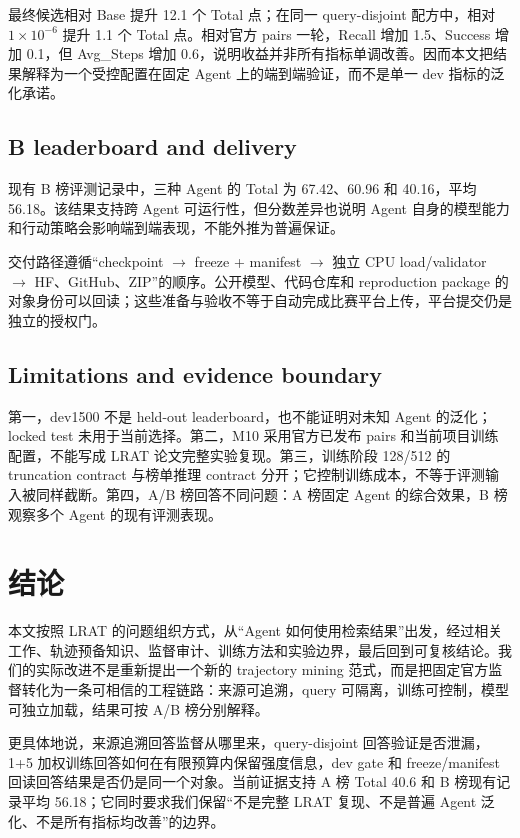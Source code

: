 \documentclass[UTF8,10pt,a4paper,twocolumn]{ctexart}
\begin{document}
最终候选相对 Base 提升 12.1 个 Total 点；在同一 query-disjoint 配方中，相对 $1\times10^{-6}$ 提升 1.1 个 Total 点。相对官方 pairs 一轮，Recall 增加 1.5、Success 增加 0.1，但 Avg\_Steps 增加 0.6，说明收益并非所有指标单调改善。因而本文把结果解释为一个受控配置在固定 Agent 上的端到端验证，而不是单一 dev 指标的泛化承诺。

\subsection{B leaderboard and delivery}

现有 B 榜评测记录中，三种 Agent 的 Total 为 67.42、60.96 和 40.16，平均 56.18。该结果支持跨 Agent 可运行性，但分数差异也说明 Agent 自身的模型能力和行动策略会影响端到端表现，不能外推为普遍保证。

交付路径遵循“checkpoint $\rightarrow$ freeze + manifest $\rightarrow$ 独立 CPU load/validator $\rightarrow$ HF、GitHub、ZIP”的顺序。公开模型、代码仓库和 reproduction package 的对象身份可以回读；这些准备与验收不等于自动完成比赛平台上传，平台提交仍是独立的授权门。

\subsection{Limitations and evidence boundary}

第一，dev1500 不是 held-out leaderboard，也不能证明对未知 Agent 的泛化；locked test 未用于当前选择。第二，M10 采用官方已发布 pairs 和当前项目训练配置，不能写成 LRAT 论文完整实验复现。第三，训练阶段 128/512 的 truncation contract 与榜单推理 contract 分开；它控制训练成本，不等于评测输入被同样截断。第四，A/B 榜回答不同问题：A 榜固定 Agent 的综合效果，B 榜观察多个 Agent 的现有评测表现。

\section{结论}

本文按照 LRAT 的问题组织方式，从“Agent 如何使用检索结果”出发，经过相关工作、轨迹预备知识、监督审计、训练方法和实验边界，最后回到可复核结论。我们的实际改进不是重新提出一个新的 trajectory mining 范式，而是把固定官方监督转化为一条可相信的工程链路：来源可追溯，query 可隔离，训练可控制，模型可独立加载，结果可按 A/B 榜分别解释。

更具体地说，来源追溯回答监督从哪里来，query-disjoint 回答验证是否泄漏，1+5 加权训练回答如何在有限预算内保留强度信息，dev gate 和 freeze/manifest 回读回答结果是否仍是同一个对象。当前证据支持 A 榜 Total 40.6 和 B 榜现有记录平均 56.18；它同时要求我们保留“不是完整 LRAT 复现、不是普遍 Agent 泛化、不是所有指标均改善”的边界。
\end{document}
